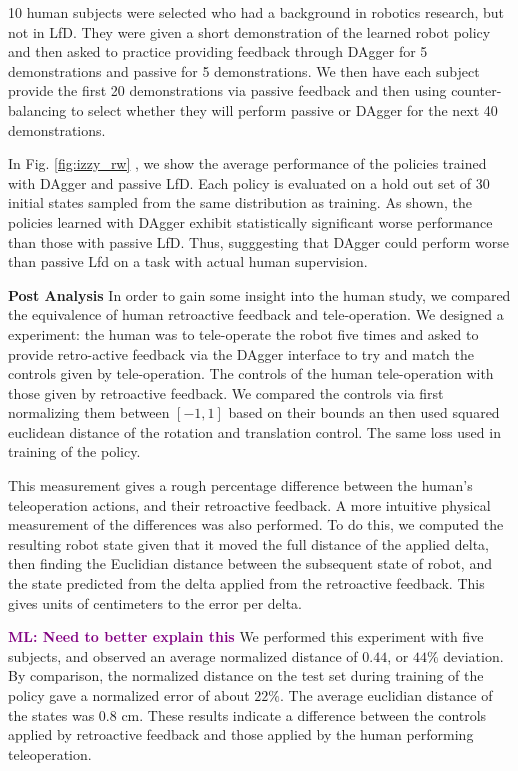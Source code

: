 \documentclass[10pt, conference]{ieeeconf}      %
\newcommand{\mlnote}[1]{%
 {\textcolor{purple}{\textbf{ML: #1}}}{}}
\begin{document}
10 human subjects were selected who had a background in robotics research, but not in LfD. They were given a short demonstration of the learned robot policy and then asked to practice providing feedback through DAgger for 5 demonstrations and passive for 5 demonstrations. We then have each subject provide the first 20 demonstrations via passive feedback and then using counter-balancing to select whether they will perform passive or DAgger for the next 40 demonstrations.  

In Fig. \ref{fig:izzy_rw} , we show the average performance of the policies trained with DAgger and passive LfD. Each policy is evaluated on a hold out set of 30 initial states sampled from the same distribution as training. As shown, the policies learned with DAgger exhibit statistically significant worse performance than those with passive LfD. Thus, sugggesting that DAgger could perform worse than passive Lfd on a task with actual human supervision. 

\noindent \textbf{Post Analysis}
In order to gain some insight into the human study, we compared the equivalence of human retroactive feedback and tele-operation. We designed a  experiment: the human was to tele-operate the robot five times and asked to provide retro-active feedback via the DAgger interface to try and match the controls given by tele-operation.    
The controls of the human tele-operation with those given by retroactive feedback. We compared the controls via first normalizing them between $[-1,1]$ based on their bounds an then used squared euclidean distance of the rotation and translation control. The same loss used in training of the policy. 

This measurement gives a rough percentage difference between the human's teleoperation actions, and their retroactive feedback. A more intuitive physical measurement of the differences was also performed. To do this, we computed the resulting robot state given that it moved the full distance of the applied delta, then finding the Euclidian distance between the subsequent state of robot, and the state predicted from the delta applied from the retroactive feedback. This gives units of centimeters to the error per delta.

\mlnote{Need to better explain this} We performed this experiment with five subjects, and observed an average normalized distance of $0.44$, or $44\%$ deviation. By comparison, the normalized distance on the test set during training of the policy gave a normalized error of about $22\%$. The average euclidian distance of the states was $0.8$ cm. These results indicate a  difference between the controls applied by retroactive feedback and those applied by the human performing teleoperation.
\end{document}
